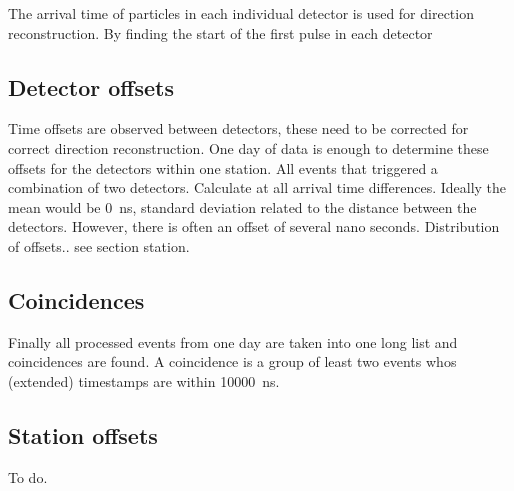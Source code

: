The arrival time of particles in each individual detector is used for direction  reconstruction. By finding the start of the first pulse in each detector 


\subsection{Detector offsets}

Time offsets are observed between detectors, these need to be corrected for correct direction reconstruction. One day of data is enough to determine these offsets for the detectors within one station. All events that triggered a combination of two detectors. Calculate at all arrival time differences. Ideally the mean would be \SI{0}{\ns}, standard deviation related to the distance between the detectors. However, there is often an offset of several nano seconds. Distribution of offsets.. see section station.


\subsection{Coincidences}

Finally all processed events from one day are taken into one long list and coincidences are found. A coincidence is a group of least two events whos (extended) timestamps are within \SI{10000}{\ns}.


\subsection{Station offsets}

To do.
